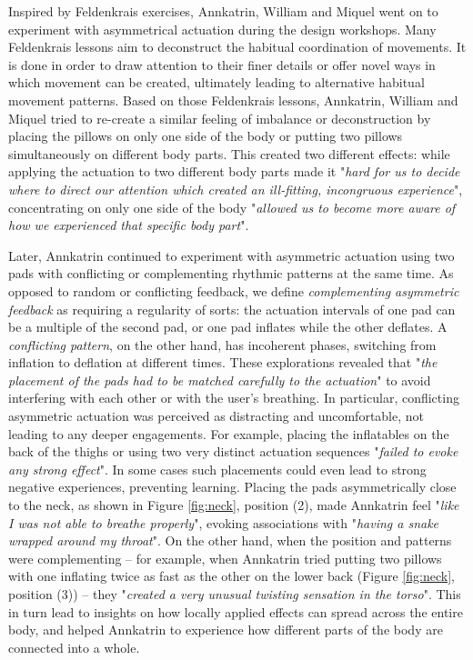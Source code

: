 Inspired by Feldenkrais exercises, Annkatrin, William and Miquel went on to experiment with asymmetrical actuation during the design workshops. Many Feldenkrais lessons aim to deconstruct the habitual coordination of movements. It is done in order to draw attention to their finer details or offer novel ways in which movement can be created, ultimately leading to alternative habitual movement patterns. Based on those Feldenkrais lessons, Annkatrin, William and Miquel tried to re-create a similar feeling of imbalance or deconstruction by placing the pillows on only one side of the body or putting two pillows simultaneously on different body parts. This created two different effects: while applying the actuation to two different body parts made it "\textit{hard for us to decide where to direct our attention which created an ill-fitting, incongruous experience}", concentrating on only one side of the body "\textit{allowed us to become more aware of how we experienced that specific body part}".

Later, Annkatrin continued to experiment with asymmetric actuation using two pads with conflicting or complementing rhythmic patterns at the same time. As opposed to random or conflicting feedback, we define \textit{complementing asymmetric feedback} as requiring a regularity of sorts: the actuation intervals of one pad can be a multiple of the second pad, or one pad inflates while the other deflates. A \textit{conflicting pattern}, on the other hand, has incoherent phases, switching from inflation to deflation at different times. These explorations revealed that "\textit{the placement of the pads had to be matched carefully to the actuation}" to avoid interfering with each other or with the user's breathing. In particular, conflicting asymmetric actuation was perceived as distracting and uncomfortable, not leading to any deeper engagements. For example, placing the inflatables on the back of the thighs or using two very distinct actuation sequences "\textit{failed to evoke any strong effect}". In some cases such placements could even lead to strong negative experiences, preventing learning. Placing the pads asymmetrically close to the neck, as shown in Figure \ref{fig:neck}, position (2), made Annkatrin feel "\textit{like I was not able to breathe properly}", evoking associations with "\textit{having a snake wrapped around my throat}". On the other hand, when the position and patterns were complementing -- for example, when Annkatrin tried putting two pillows with one inflating twice as fast as the other on the lower back (Figure \ref{fig:neck}, position (3)) -- they "\textit{created a very unusual twisting sensation in the torso}". This in turn lead to insights on how locally applied effects can spread across the entire body, and helped Annkatrin to experience how different parts of the body are connected into a whole. 

